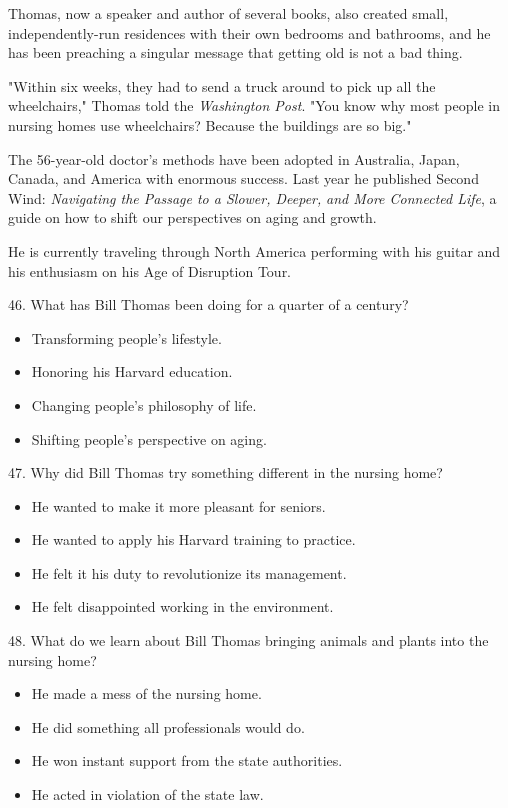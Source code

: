 \documentclass[UTF8,11pt]{ctexart}
\begin{document}
Thomas, now a speaker and author of several books, also created small, independently-run residences with their own bedrooms and bathrooms, and he has been preaching a singular message that getting old is not a bad thing.


"Within six weeks, they had to send a truck around to pick up all the wheelchairs," Thomas told the \textit{Washington Post}. "You know why most people in nursing homes use wheelchairs? Because the buildings are so big."


The 56-year-old doctor's methods have been adopted in Australia, Japan, Canada, and America with enormous success. Last year he published Second Wind: \textit{Navigating the Passage to a Slower, Deeper,} \textit{and More Connected Life}, a guide on how to shift our perspectives on aging and growth.


He is currently traveling through North America performing with his guitar and his enthusiasm on his Age of Disruption Tour.


46. What has Bill Thomas been doing for a quarter of a century?


\begin{itemize}[leftmargin=2em,itemsep=.2em,topsep=.4em]\item[A.] Transforming people's lifestyle.
\item[B.] Honoring his Harvard education.
\item[C.] Changing people's philosophy of life.
\item[D.] Shifting people's perspective on aging.
\end{itemize}

47. Why did Bill Thomas try something different in the nursing home?


\begin{itemize}[leftmargin=2em,itemsep=.2em,topsep=.4em]\item[A.] He wanted to make it more pleasant for seniors.
\item[B.] He wanted to apply his Harvard training to practice.
\item[C.] He felt it his duty to revolutionize its management.
\item[D.] He felt disappointed working in the environment.
\end{itemize}

48. What do we learn about Bill Thomas bringing animals and plants into the nursing home?


\begin{itemize}[leftmargin=2em,itemsep=.2em,topsep=.4em]\item[A.] He made a mess of the nursing home.
\item[B.] He did something all professionals would do.
\item[C.] He won instant support from the state authorities.
\item[D.] He acted in violation of the state law.
\end{itemize}
\end{document}

